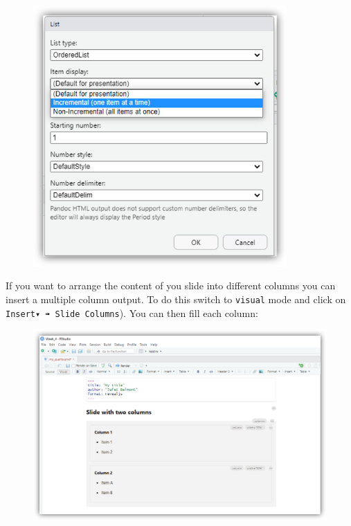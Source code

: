 \documentclass[
  letterpaper,
  DIV=11,
  numbers=noendperiod]{scrartcl}
\begin{document}
\begin{figure}

{\centering \includegraphics[width=3.8125in,height=\textheight]{images/quarto11.png}

}

\end{figure}

If you want to arrange the content of you slide into different columns
you can insert a multiple column output. To do this switch to
\texttt{visual} mode and click on \texttt{Insert▾\ ➠\ Slide\ Columns}).
You can then fill each column:

\begin{figure}

{\centering \includegraphics{images/quarto12.png}

}

\end{figure}
\end{document}
